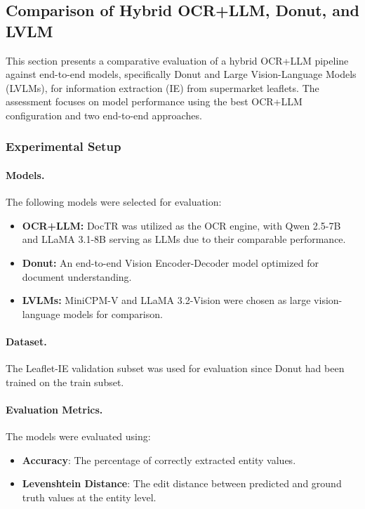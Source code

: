 \documentclass[11pt]{article}
\begin{document}
\subsection{Comparison of Hybrid OCR+LLM, Donut, and LVLM}

This section presents a comparative evaluation of a hybrid OCR+LLM pipeline against end-to-end models, specifically Donut and Large Vision-Language Models (LVLMs), for information extraction (IE) from supermarket leaflets. The assessment focuses on model performance using the best OCR+LLM configuration and two end-to-end approaches.

\subsubsection{Experimental Setup}

\paragraph{Models.} The following models were selected for evaluation:
\begin{itemize}
    \item \textbf{OCR+LLM:} DocTR was utilized as the OCR engine, with Qwen 2.5-7B and LLaMA 3.1-8B serving as LLMs due to their comparable performance.
    \item \textbf{Donut:} An end-to-end Vision Encoder-Decoder model optimized for document understanding.
    \item \textbf{LVLMs:} MiniCPM-V and LLaMA 3.2-Vision were chosen as large vision-language models for comparison.
\end{itemize}

\paragraph{Dataset.} The Leaflet-IE validation subset was used for evaluation since Donut had been trained on the train subset.

\paragraph{Evaluation Metrics.} The models were evaluated using:
\begin{itemize}
    \item \textbf{Accuracy}: The percentage of correctly extracted entity values.
    \item \textbf{Levenshtein Distance}: The edit distance between predicted and ground truth values at the entity level.
\end{itemize}
\end{document}
